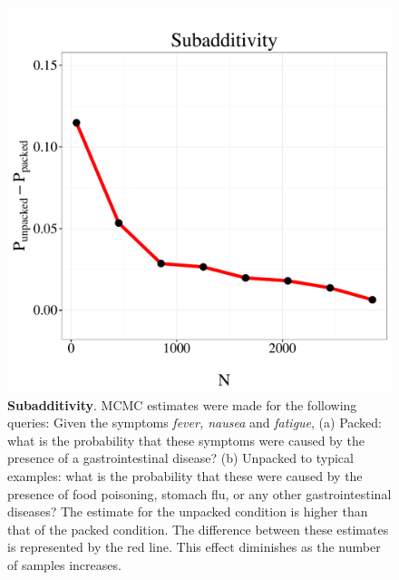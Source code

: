 \begin{figure}
\centering
\includegraphics[scale = 0.5]{figures/sub.pdf}
\caption{\textbf{Subadditivity}. MCMC estimates were made for the following queries: Given the symptoms \emph{fever, nausea} and \emph{fatigue}, (a) Packed: what is the probability that these symptoms were caused by the presence of a gastrointestinal disease? (b) Unpacked to typical examples: what is the probability that these were caused by the presence of food poisoning, stomach flu, or any other gastrointestinal diseases? The estimate for the unpacked condition is higher than that of the packed condition. The difference between these estimates is represented by the red line. This effect diminishes as the number of samples increases.}
\label{fig:subadd}
\end{figure}


